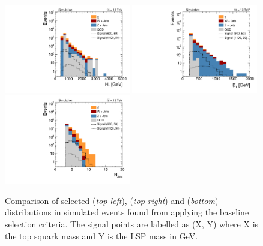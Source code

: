 \begin{figure}[!t]
  \centering
  \begin{minipage}[c]{1.\textwidth}
    \begin{center}
      \includegraphics[width=0.49\textwidth]{figures/Stop_DeltaPhiSelection_HThad.pdf}  
      \includegraphics[width=0.49\textwidth]{figures/Stop_DeltaPhiSelection_MET.pdf} \\
      \includegraphics[width=0.49\textwidth]{figures/Stop_DeltaPhiSelection_N_jets.pdf} 
    \end{center}
  \end{minipage}

  \caption{Comparison of selected \HT (\textit{top left}), \met (\textit{top right}) and \NJets (\textit{bottom}) distributions in simulated events found from applying the baseline selection criteria. The signal points are labelled as (X, Y) where X is the top squark mass and Y is the LSP mass in GeV.}
  \label{fig:stop_baseline} 
\end{figure}
\\
